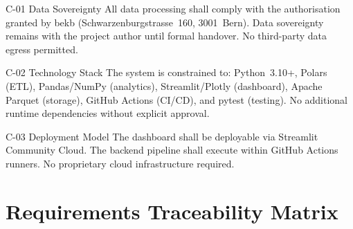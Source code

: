 \documentclass[
  11pt,
  a4paper,
  twoside,
  openany
]{report}
\begin{document}
\begin{constraintbox}{C-01 \;\textbar\; Data Sovereignty}
All data processing shall comply with the authorisation granted by \gls{bekb} (Schwarzenburgstrasse~160, 3001~Bern).  Data sovereignty remains with the project author until formal handover.  No third-party data egress permitted.
\end{constraintbox}

\vspace{6pt}

\begin{constraintbox}{C-02 \;\textbar\; Technology Stack}
The system is constrained to: Python~3.10+, Polars (ETL), Pandas/NumPy (analytics), Streamlit/Plotly (dashboard), Apache Parquet (storage), GitHub Actions (CI/CD), and pytest (testing).  No additional runtime dependencies without explicit approval.
\end{constraintbox}

\vspace{6pt}

\begin{constraintbox}{C-03 \;\textbar\; Deployment Model}
The dashboard shall be deployable via Streamlit Community Cloud.  The backend pipeline shall execute within GitHub Actions runners.  No proprietary cloud infrastructure required.
\end{constraintbox}

\section{Requirements Traceability Matrix}
\end{document}
